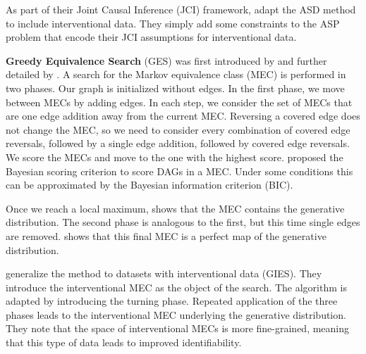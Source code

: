 As part of their Joint Causal Inference (JCI) framework, \citet{mooij2016joint} adapt the ASD method to include interventional data. They simply add some constraints to the ASP problem that encode their JCI assumptions for interventional data.



\textbf{Greedy Equivalence Search} (GES) was first introduced by \citet{meek1997graphical} and further detailed by \citet{chickering2002optimal}. A search for the Markov equivalence class (MEC) is performed in two phases. Our graph is initialized without edges. In the first phase, we move between MECs by adding edges. In each step, we consider the set of MECs that are one edge addition away from the current MEC. Reversing a covered edge does not change the MEC, so we need to consider every combination of covered edge reversals, followed by a single edge addition, followed by covered edge reversals. We score the MECs and move to the one with the highest score. \citet{meek1997graphical} proposed the Bayesian scoring criterion to score DAGs in a MEC. Under some conditions this can be approximated by the Bayesian information criterion (BIC). 

Once we reach a local maximum, \citet{chickering2002optimal} shows that the MEC contains the generative distribution. The second phase is analogous to the first, but this time single edges are removed. \citet{chickering2002optimal} shows that this final MEC is a perfect map of the generative distribution.

\citet{hauser2012characterization} generalize the method to datasets with interventional data (GIES). They introduce the interventional MEC as the object of the search. The algorithm is adapted by introducing the turning phase. Repeated application of the three phases leads to the interventional MEC underlying the generative distribution. They note that the space of interventional MECs is more fine-grained, meaning that this type of data leads to improved identifiability.


